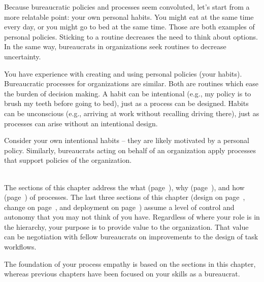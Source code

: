 
Because bureaucratic policies and processes seem convoluted, let's start from a more relatable point: your own personal habits.
You might eat at the same time every day, or you might go to bed at the same time. Those are both examples of personal policies. Sticking to a routine decreases the need to think about options. In the same way, bureaucrats in organizations seek routines to decrease uncertainty. 

You have experience with creating and using personal policies (your habits).  Bureaucratic processes for organizations are similar.
Both are routines which ease the burden of decision making. A habit can be intentional (e.g., my policy is to brush my teeth before going to bed), just as a process can be designed. Habits can be unconscious (e.g., arriving at work without recalling driving there), just as processes can arise without an intentional design. 

Consider your own intentional habits -- they are likely motivated by a personal policy. Similarly, bureaucrats acting on behalf of an organization apply processes that support policies of the organization.

\ \\

The sections of this chapter address the what (page~\pageref{sec:definition-of-process}), why (page~\pageref{sec:why-processes-exist}), and how (page~\pageref{sec:process-chaos}) of processes. 
The last three sections of this chapter (design on page~\pageref{sec:design-of-processes}, change on page~\pageref{sec:change-a-process}, and deployment on page~\pageref{sec:deployment-of-processes}) assume a level of control and autonomy that you may not think of you have. Regardless of where your role is in the hierarchy, your purpose is to provide value to the organization. That value can be negotiation with fellow bureaucrats on improvements to the design of task workflows. 

The foundation of your \gls{process empathy} is based on the sections in this chapter, whereas previous chapters have been focused on your skills as a bureaucrat. 